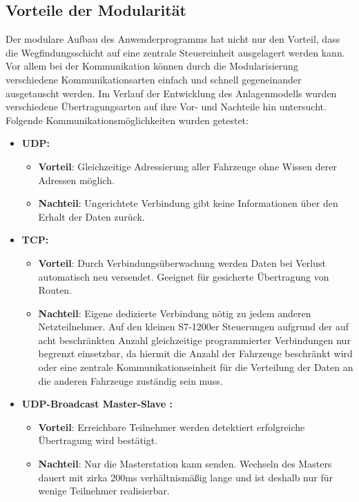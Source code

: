 	\subsection{Vorteile der Modularität}
		
		Der modulare Aufbau des Anwenderprogramms hat nicht nur den Vorteil, dass die Wegfindungsschicht auf eine zentrale Steuereinheit ausgelagert werden kann. Vor allem bei der Kommunikation können durch die Modularisierung verschiedene Kommunikationsarten einfach und schnell gegeneinander ausgetauscht werden. Im Verlauf der Entwicklung des Anlagenmodells wurden verschiedene Übertragungsarten auf ihre Vor- und Nachteile hin untersucht.
		Folgende Kommunikationsmöglichkeiten wurden getestet:
		
		\begin{itemize}
			\item \textbf{\ac{UDP}:} 
				\begin{itemize}
					\item \textbf{Vorteil}: Gleichzeitige Adressierung aller Fahrzeuge ohne Wissen derer Adressen möglich.
					\item \textbf{Nachteil}: Ungerichtete Verbindung gibt keine Informationen über den Erhalt der Daten zurück.
				\end{itemize}
			\item \textbf{\acs{TCP}:}
				\begin{itemize}
					\item \textbf{Vorteil}: Durch Verbindungsüberwachung werden Daten bei Verlust automatisch neu versendet. Geeignet für gesicherte Übertragung von Routen.
					\item \textbf{Nachteil}: Eigene dedizierte Verbindung nötig zu jedem anderen Netzteilnehmer. Auf den kleinen S7-1200er Steuerungen aufgrund der auf acht beschränkten Anzahl gleichzeitige programmierter Verbindungen\cite{S7-1200} nur begrenzt einsetzbar, da hiermit die Anzahl der Fahrzeuge beschränkt wird oder eine zentrale Kommunikationseinheit für die Verteilung der Daten an die anderen Fahrzeuge zuständig sein muss.
				\end{itemize}
			\item \textbf{\ac{UDP}-Broadcast Master-Slave \cite{MasterSlaveUDP}:}
				\begin{itemize}
					\item \textbf{Vorteil}: Erreichbare Teilnehmer werden detektiert erfolgreiche Übertragung wird bestätigt.
					\item \textbf{Nachteil}: Nur die Masterstation kann senden. Wechseln des Masters dauert mit zirka 200ms verhältnismäßig lange und ist deshalb nur für wenige Teilnehmer realisierbar. 

\end{itemize}
\end{itemize}
